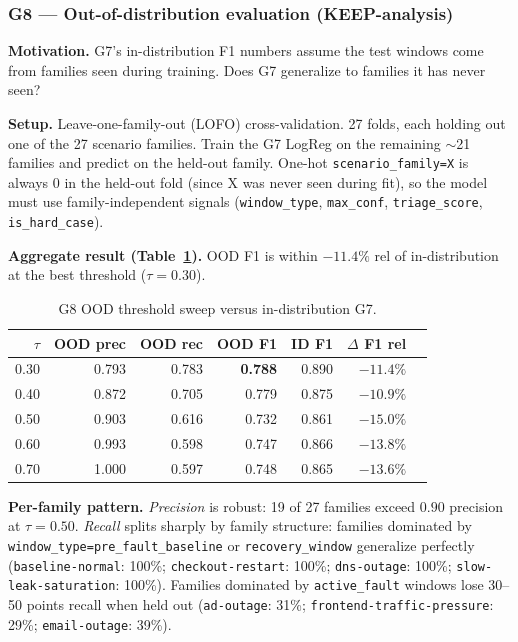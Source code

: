\subsubsection{G8 --- Out-of-distribution evaluation (KEEP-analysis)}

\textbf{Motivation.} G7's in-distribution F1 numbers assume the test windows come from families seen during training. Does G7 generalize to families it has never seen?

\textbf{Setup.} Leave-one-family-out (LOFO) cross-validation. 27 folds, each holding out one of the 27 scenario families. Train the G7 LogReg on the remaining $\sim$21 families and predict on the held-out family. One-hot \texttt{scenario\_family=X} is always 0 in the held-out fold (since X was never seen during fit), so the model must use family-independent signals (\texttt{window\_type}, \texttt{max\_conf}, \texttt{triage\_score}, \texttt{is\_hard\_case}).

\textbf{Aggregate result (Table~\ref{tab:g8-sweep}).} OOD F1 is within $-11.4\%$ rel of in-distribution at the best threshold ($\tau = 0.30$).

\begin{table}[h]
\centering
\caption{G8 OOD threshold sweep versus in-distribution G7.}
\label{tab:g8-sweep}
\small
\begin{tabular}{rrrrrrr}
\toprule
$\tau$ & OOD prec & OOD rec & OOD F1 & ID F1 & $\Delta$ F1 rel \\
\midrule
0.30 & 0.793 & 0.783 & \textbf{0.788} & 0.890 & $-11.4\%$ \\
0.40 & 0.872 & 0.705 & 0.779 & 0.875 & $-10.9\%$ \\
0.50 & 0.903 & 0.616 & 0.732 & 0.861 & $-15.0\%$ \\
0.60 & 0.993 & 0.598 & 0.747 & 0.866 & $-13.8\%$ \\
0.70 & 1.000 & 0.597 & 0.748 & 0.865 & $-13.6\%$ \\
\bottomrule
\end{tabular}
\end{table}

\textbf{Per-family pattern.} \emph{Precision} is robust: 19 of 27 families exceed $0.90$ precision at $\tau = 0.50$. \emph{Recall} splits sharply by family structure: families dominated by \texttt{window\_type=pre\_fault\_baseline} or \texttt{recovery\_window} generalize perfectly (\texttt{baseline-normal}: 100\%; \texttt{checkout-restart}: 100\%; \texttt{dns-outage}: 100\%; \texttt{slow-leak-saturation}: 100\%). Families dominated by \texttt{active\_fault} windows lose 30--50 points recall when held out (\texttt{ad-outage}: 31\%; \texttt{frontend-traffic-pressure}: 29\%; \texttt{email-outage}: 39\%).

